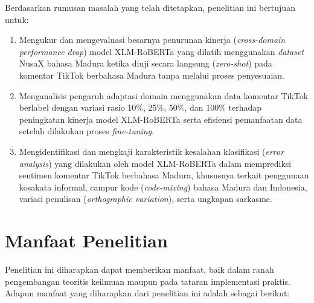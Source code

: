 Berdasarkan rumusan masalah yang telah ditetapkan, penelitian ini bertujuan untuk:
\begin{enumerate}
    \item Mengukur dan mengevaluasi besarnya penurunan kinerja (\textit{cross-domain performance drop}) model XLM-RoBERTa yang dilatih menggunakan \textit{dataset} NusaX bahasa Madura ketika diuji secara langsung (\textit{zero-shot}) pada komentar TikTok berbahasa Madura tanpa melalui proses penyesuaian.
    \item Menganalisis pengaruh adaptasi domain menggunakan data komentar TikTok berlabel dengan variasi rasio 10\%, 25\%, 50\%, dan 100\% terhadap peningkatan kinerja model XLM-RoBERTa serta efisiensi pemanfaatan data setelah dilakukan proses \textit{fine-tuning}.
    \item Mengidentifikasi dan mengkaji karakteristik kesalahan klasifikasi (\textit{error analysis}) yang dilakukan oleh model XLM-RoBERTa dalam memprediksi sentimen komentar TikTok berbahasa Madura, khususnya terkait penggunaan kosakata informal, campur kode (\textit{code-mixing}) bahasa Madura dan Indonesia, variasi penulisan (\textit{orthographic variation}), serta ungkapan sarkasme.
\end{enumerate}

\section{Manfaat Penelitian}

Penelitian ini diharapkan dapat memberikan manfaat, baik dalam ranah pengembangan teoritis keilmuan maupun pada tataran implementasi praktis. Adapun manfaat yang diharapkan dari penelitian ini adalah sebagai berikut:

